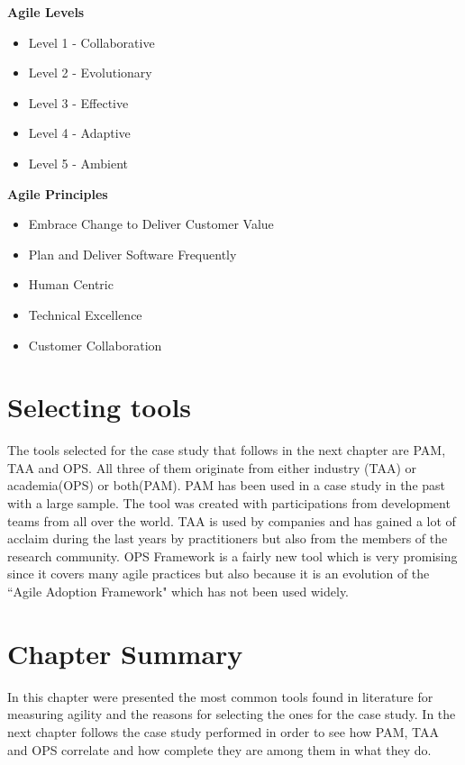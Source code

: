 \begin{minipage}[t]{0.35\linewidth}
    \textbf{Agile Levels}
    \begin{itemize}
    \item{Level 1 - Collaborative}
    \item{Level 2 - Evolutionary}
    \item{Level 3 - Effective}
    \item{Level 4 - Adaptive}
    \item{Level 5 - Ambient}
    \end{itemize}
    \end{minipage}
    \begin{minipage}[t]{0.6\linewidth}
    \textbf{Agile Principles}
    \begin{itemize}
    \item{Embrace Change to Deliver Customer Value}
    \item{Plan and Deliver Software Frequently}
    \item{Human Centric}
    \item{Technical Excellence}
    \item{Customer Collaboration}
    \end{itemize}
\end{minipage}

\section{Selecting tools}
The tools selected for the case study that follows in the next chapter are \ac{PAM}, \ac{TAA} and \ac{OPS}. All three of them originate from either industry (\ac{TAA}) or academia(\ac{OPS}) or both(\ac{PAM}). \ac{PAM} has been used in a case study in the past with a large sample. The tool was created with participations from development teams from all over the world. \ac{TAA} is used by companies and has gained a lot of acclaim during the last years by practitioners but also from the members of the research community. \ac{OPS} Framework is a fairly new tool which is very promising since it covers many agile practices but also because it is an evolution of the ``Agile Adoption Framework" \cite{sidky} which has not been used widely.


\section{Chapter Summary}
In this chapter were presented the most common tools found in literature for measuring agility and the reasons for selecting the ones for the case study. In the next chapter follows the case study performed in order to see how \ac{PAM}, \ac{TAA} and \ac{OPS} correlate and how complete they are among them in what they do.